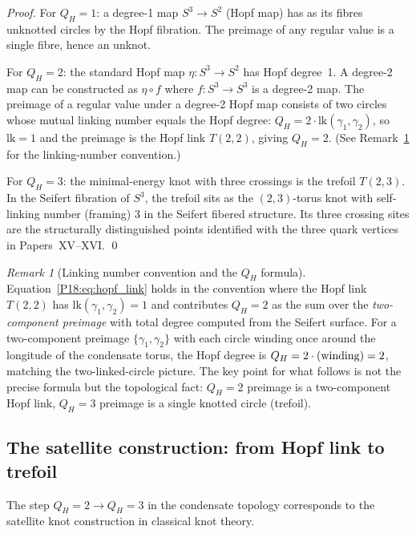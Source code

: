\documentclass[11pt,a4paper]{article}
\theoremstyle{definition}\newtheorem{definition}[theorem]{Definition}
\theoremstyle{remark}
\newtheorem{remark}[theorem]{Remark}
\newcommand{\QH}{Q_H}
\newcommand{\lk}{\mathrm{lk}}
\begin{document}
\begin{proof}
For $\QH=1$: a degree-1 map $S^3\to S^2$ (Hopf map) has as its
fibres unknotted circles by the Hopf fibration.  The preimage of
any regular value is a single fibre, hence an unknot.

For $\QH=2$: the standard Hopf map $\eta:S^3\to S^2$ has Hopf
degree~1.  A degree-2 map can be constructed as $\eta\circ f$
where $f:S^3\to S^3$ is a degree-2 map.  The preimage of a regular
value under a degree-2 Hopf map consists of two circles whose
mutual linking number equals the Hopf degree:
$\QH=2\cdot\lk(\gamma_1,\gamma_2)$, so $\lk=1$ and the preimage
is the Hopf link $T(2,2)$, giving $\QH=2$.
(See Remark~\ref{P18:rem:link_convention} for the linking-number
convention.)

For $\QH=3$: the minimal-energy knot with three crossings is the
trefoil $T(2,3)$.  In the Seifert fibration of $S^3$, the trefoil
sits as the $(2,3)$-torus knot with self-linking number (framing)
$3$ in the Seifert fibered structure.  Its three crossing sites are
the structurally distinguished points identified with the three
quark vertices in Papers~XV--XVI.
\qed
\end{proof}

\begin{remark}[Linking number convention and the $\QH$ formula]
\label{P18:rem:link_convention}
Equation~\eqref{P18:eq:hopf_link} holds in the convention where the
Hopf link $T(2,2)$ has $\lk(\gamma_1,\gamma_2)=1$ and contributes
$\QH=2$ as the sum over the \emph{two-component preimage} with
total degree computed from the Seifert surface.  For a two-component
preimage $\{\gamma_1,\gamma_2\}$ with each circle winding once
around the longitude of the condensate torus, the Hopf degree is
$\QH=2\cdot({\rm winding}) = 2$, matching the two-linked-circle
picture.  The key point for what follows is not the precise formula
but the topological fact: $\QH=2$ preimage is a two-component Hopf
link, $\QH=3$ preimage is a single knotted circle (trefoil).
\end{remark}

\subsection{The satellite construction: from Hopf link to trefoil}
\label{P18:sec:satellite}

The step $\QH=2\to\QH=3$ in the condensate topology corresponds
to the satellite knot construction in classical knot theory.
\end{document}
